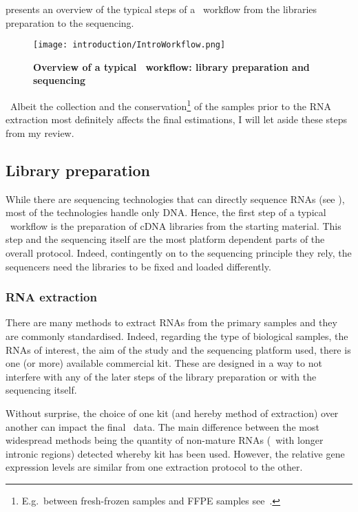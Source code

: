  presents an overview of the typical steps of a
\Rnaseq\ workflow from the libraries preparation to the sequencing.

\begin{figure}
    \texttt{[image: introduction/IntroWorkflow.png]}\centering
    \caption[Overview of a \Rnaseq\ workflow: library preparation
    and sequencing]{\label{fig:OverviewRnaseqPrepSeq}\textbf{Overview of
    a typical \Rnaseq\ workflow:
    library preparation and sequencing}}
\end{figure}

\NB\ Albeit the collection and the conservation\footnote{E.g.\ between fresh-frozen
samples and \gls{FFPE} samples see~\cite{sampleConservationMatters}.}
of the samples prior to the
\gls{RNA} extraction most definitely affects the final estimations,
I will let aside these steps from my review.

\subsection{Library preparation}

While there are sequencing technologies that can directly sequence \glspl{RNA}
(see ), most of the technologies handle only \gls{DNA}.
Hence, the first step of a typical \Rnaseq\ workflow is the preparation of
\gls{cDNA} libraries from the starting material. This step and the sequencing
itself are the most platform dependent parts of the overall protocol.
Indeed, contingently on to the sequencing principle they rely,
the sequencers need the libraries to be fixed and loaded differently.

\subsubsection{\gls{RNA} extraction}

There are many methods to extract \glspl{RNA} from the primary samples and they
are commonly standardised. Indeed, regarding the type of biological samples,
the \glspl{RNA} of interest, the aim of the  study and the sequencing platform
used, there is one (or more) available commercial kit. These are designed in
a way to not interfere
with any of the later steps of the library preparation or with the sequencing
itself.

Without surprise, the choice of one kit (and hereby method of extraction)
over another can impact the final \Rnaseq\ data. The main difference between
the most widespread methods being the quantity of non-mature \glspl{RNA}
(\ie\ with longer intronic regions) detected whereby kit has been used.
However, the relative gene expression levels are similar from one extraction
protocol to the other. 


